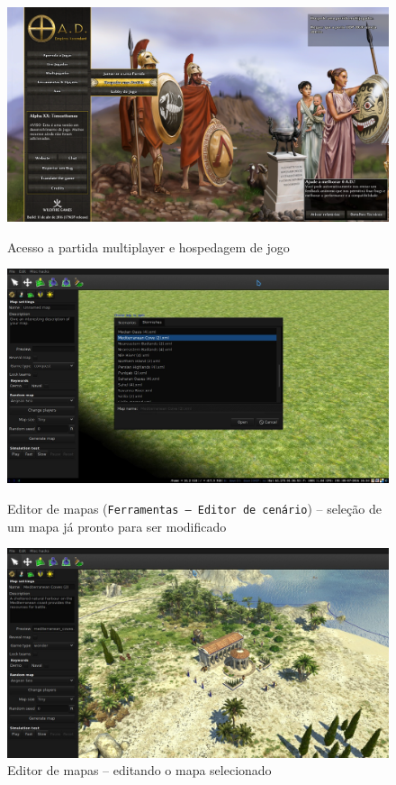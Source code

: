 \documentclass[article,11pt, a4paper,sumario=tradicional]{abntex2}
\begin{document}
	\begin{figure}
		\centering
		\includegraphics[width=0.9\linewidth]{screenshots_0ad/screenshot0015}
		\caption[]{Acesso a partida multiplayer e hospedagem de jogo}
		\label{fig:screenshot0015}
		
		\includegraphics[width=0.9\linewidth]{screenshots_0ad/4_032.jpg}
		\caption{Editor de mapas (\texttt{Ferramentas -- Editor de cenário}) -- seleção de um mapa já pronto para ser modificado}
		\label{fig:4_032}
		
		\includegraphics[width=0.9\linewidth]{screenshots_0ad/editor_de_cenario}
		\caption{Editor de mapas -- editando o mapa selecionado}
		\label{fig:4_03}
	
		
	\end{figure}
\end{document}
